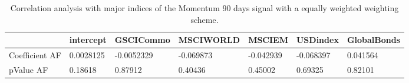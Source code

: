 \begin{table}[H]
\centering
\begin{tabular}{lllllll}
& intercept & GSCICommo & MSCIWORLD & MSCIEM & USDindex & GlobalBonds \\ 
\hline 
Coefficient AF & 0.0028125 & -0.0052329 & -0.069873 & -0.042939 & -0.068397 & 0.041564 \\ 
pValue AF & 0.18618 & 0.87912 & 0.40436 & 0.45002 & 0.69325 & 0.82101 \\ 
\hline
\end{tabular}
\caption{Correlation analysis with major indices of the Momentum 90 days signal with a equally weighted weighting scheme.}
\label{MOM90EW_AFACTOR}
\end{table}